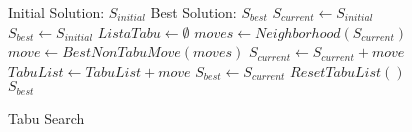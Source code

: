 \begin{figure}
\begin{algorithmic}[1]
\REQUIRE Initial Solution: $S_{initial}$
\ENSURE Best Solution: $S_{best}$
\STATE $S_{current} \gets S_{initial}$
\STATE $S_{best} \gets S_{initial}$ 
\STATE $ListaTabu \gets \emptyset$
  \label{alg:tabu:inicioloop}
  \STATE $moves \gets Neighborhood(S_{current})$
    \label{alg:tabu:vizinhanca}
  \STATE $move \gets BestNonTabuMove(moves)$
    \label{alg:tabu:melhormovimento}
  \STATE $S_{current} \gets S_{current} + move$
    \label{alg:tabu:movimento}
  \STATE $TabuList \gets TabuList + move$
    \label{alg:tabu:tabu}
    \STATE $S_{best} \gets S_{current}$
      \label{alg:tabu:melhor}
     \STATE $ResetTabuList()$
  \ENDIF
\ENDWHILE
  \label{alg:tabu:fimloop}
\RETURN $S_{best}$
\end{algorithmic}
\caption{Tabu Search}
\label{alg:tabu}
\end{figure}

